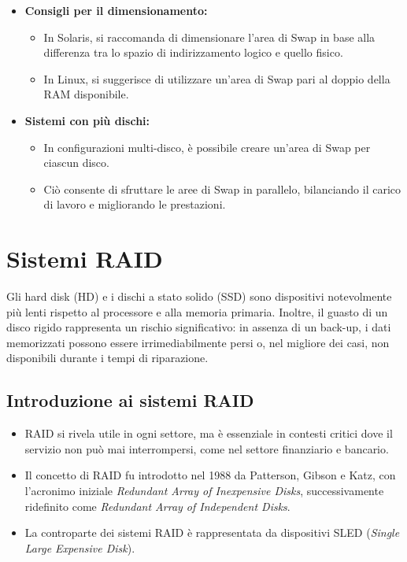 \begin{itemize}
    \item \textbf{Consigli per il dimensionamento:}
    \begin{itemize}
        \item In Solaris, si raccomanda di dimensionare l’area di Swap in base alla differenza tra lo spazio di indirizzamento logico e quello fisico.
        \item In Linux, si suggerisce di utilizzare un’area di Swap pari al doppio della RAM disponibile.
    \end{itemize}
    
    \item \textbf{Sistemi con più dischi:}
    \begin{itemize}
        \item In configurazioni multi-disco, è possibile creare un’area di Swap per ciascun disco.
        \item Ciò consente di sfruttare le aree di Swap in parallelo, bilanciando il carico di lavoro e migliorando le prestazioni.
    \end{itemize}
\end{itemize}


\section{Sistemi RAID}
Gli hard disk (HD) e i dischi a stato solido (SSD) sono dispositivi notevolmente più lenti rispetto al processore e alla memoria primaria. Inoltre, il guasto di un disco rigido rappresenta un rischio significativo: in assenza di un back-up, i dati memorizzati possono essere irrimediabilmente persi o, nel migliore dei casi, non disponibili durante i tempi di riparazione.

\subsection{Introduzione ai sistemi RAID}


\begin{itemize}
    \item RAID si rivela utile in ogni settore, ma è essenziale in contesti critici dove il servizio non può mai interrompersi, come nel settore finanziario e bancario.
    \item Il concetto di RAID fu introdotto nel 1988 da Patterson, Gibson e Katz, con l'acronimo iniziale \textit{Redundant Array of Inexpensive Disks}, successivamente ridefinito come \textit{Redundant Array of Independent Disks}.
    \item La controparte dei sistemi RAID è rappresentata da dispositivi SLED (\textit{Single Large Expensive Disk}).
\end{itemize}

